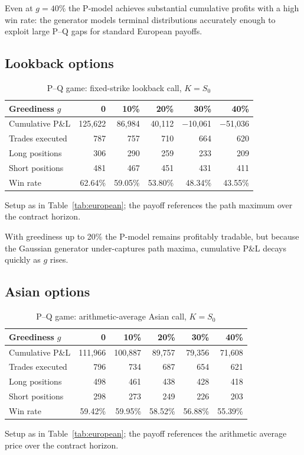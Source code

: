 \documentclass[12pt,letterpaper]{article}
\newcommand{\tabnote}[1]{\begin{minipage}{\linewidth}\vspace{4pt}\footnotesize\singlespacing #1\end{minipage}}
\begin{document}
Even at $g = 40\%$ the P-model achieves substantial cumulative profits with
a high win rate: the generator models terminal distributions accurately
enough to exploit large P--Q gaps for standard European payoffs.

\subsection{Lookback options}

\begin{table}[ht]
\singlespacing
\centering
\caption{P--Q game: fixed-strike lookback call, $K = S_0$}
\label{tab:lookback}
\begin{tabular}{lrrrrr}
\toprule
Greediness $g$ & 0 & 10\% & 20\% & 30\% & 40\% \\
\midrule
Cumulative P\&L & 125{,}622 & 86{,}984 & 40{,}112 & $-$10{,}061 & $-$51{,}036 \\
Trades executed & 787 & 757 & 710 & 664 & 620 \\
Long positions  & 306 & 290 & 259 & 233 & 209 \\
Short positions & 481 & 467 & 451 & 431 & 411 \\
Win rate & 62.64\% & 59.05\% & 53.80\% & 48.34\% & 43.55\% \\
\bottomrule
\end{tabular}
\tabnote{Setup as in Table~\ref{tab:european}; the payoff references the
path maximum over the contract horizon.}
\end{table}

With greediness up to 20\% the P-model remains profitably tradable, but
because the Gaussian generator under-captures path maxima, cumulative P\&L
decays quickly as $g$ rises.

\subsection{Asian options}

\begin{table}[ht]
\singlespacing
\centering
\caption{P--Q game: arithmetic-average Asian call, $K = S_0$}
\label{tab:asian}
\begin{tabular}{lrrrrr}
\toprule
Greediness $g$ & 0 & 10\% & 20\% & 30\% & 40\% \\
\midrule
Cumulative P\&L & 111{,}966 & 100{,}887 & 89{,}757 & 79{,}356 & 71{,}608 \\
Trades executed & 796 & 734 & 687 & 654 & 621 \\
Long positions  & 498 & 461 & 438 & 428 & 418 \\
Short positions & 298 & 273 & 249 & 226 & 203 \\
Win rate & 59.42\% & 59.95\% & 58.52\% & 56.88\% & 55.39\% \\
\bottomrule
\end{tabular}
\tabnote{Setup as in Table~\ref{tab:european}; the payoff references the
arithmetic average price over the contract horizon.}
\end{table}
\end{document}

